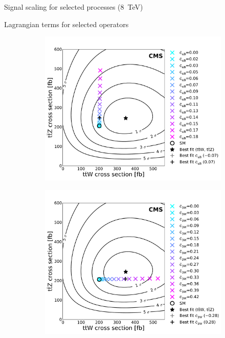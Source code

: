 \begin{table}
  \centering
  \caption{Signal scaling for selected processes (\SI{8}{TeV})}
  \label{tab:8-scaling}
  
\end{table}
\begin{table}
  \centering
  \caption{Lagrangian terms for selected operators}
  \label{tab:operators}
  
\end{table}

\begin{figure}
  \begin{subfigure}{0.5\textwidth}
    \includegraphics[width=\textwidth]{figures/eight-TeV/NP/operator_points_color_cycled_cuB_ttZ_ttW_2d_v4_mod_print}
    \caption{}
  \end{subfigure}%
  \begin{subfigure}{0.5\textwidth}
    \includegraphics[width=\textwidth]{figures/eight-TeV/NP/operator_points_color_cycled_c3W_ttZ_ttW_2d_v4_mod_print}

\end{subfigure}
\end{figure}
